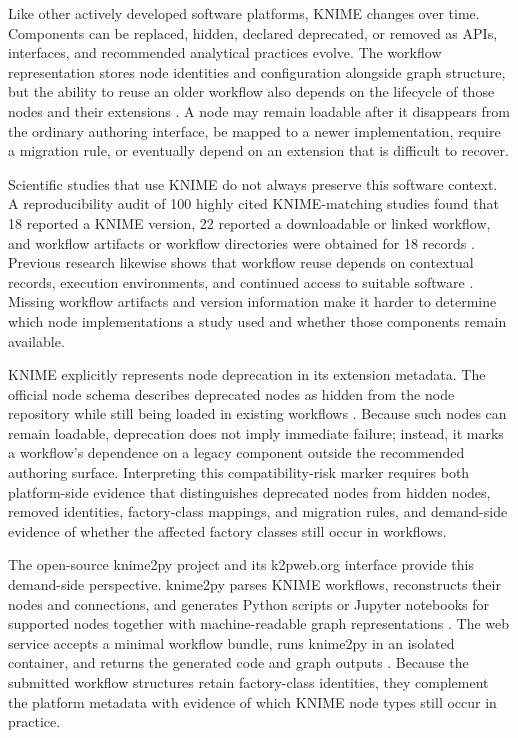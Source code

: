 \documentclass[runningheads]{llncs}
\begin{document}
Like other actively developed software platforms, KNIME changes over time.
Components can be replaced, hidden, declared deprecated, or removed as APIs,
interfaces, and recommended analytical practices evolve. The workflow
representation stores node identities and configuration alongside graph
structure, but the ability to reuse an older workflow also depends on the
lifecycle of those nodes and their extensions
\cite{DeRoure2011Preservation,Belhajjame2011Substitute}. A node may remain
loadable after it disappears from the ordinary authoring interface, be mapped
to a newer implementation, require a migration rule, or eventually depend on
an extension that is difficult to recover.

Scientific studies that use KNIME do not always preserve this software context.
A reproducibility audit of 100 highly cited KNIME-matching studies found that
18 reported a KNIME version, 22 reported a downloadable or linked workflow, and
workflow artifacts or workflow directories were obtained for 18 records
\cite{KaplanKNIMEWorkflowAudit2026}. Previous research likewise shows that
workflow reuse depends on contextual records, execution environments, and
continued access to suitable software
\cite{Willoughby2017Documentation,Ghoshal2021ScienceCapsule}. Missing workflow
artifacts and version information make it harder to determine which node
implementations a study used and whether those components remain available.

KNIME explicitly represents node deprecation in its extension metadata. The
official node schema describes deprecated nodes as hidden from the node
repository while still being loaded in existing workflows
\cite{KNIMEWorkbenchNodeSchema2026}. Because such nodes can remain loadable,
deprecation does not imply immediate failure; instead, it marks a workflow's
dependence on a legacy component outside the recommended authoring surface.
Interpreting this compatibility-risk marker requires both platform-side
evidence that distinguishes deprecated nodes from hidden nodes, removed
identities, factory-class mappings, and migration rules, and demand-side
evidence of whether the affected factory classes still occur in workflows.

The open-source knime2py project and its k2pweb.org interface provide this
demand-side perspective. knime2py parses KNIME workflows, reconstructs their
nodes and connections, and generates Python scripts or Jupyter notebooks for
supported nodes together with machine-readable graph representations
\cite{KaplanKnime2py2026}. The web service accepts a minimal workflow bundle,
runs knime2py in an isolated container, and returns the generated code and
graph outputs \cite{K2PWeb2026}. Because the submitted workflow structures retain
factory-class identities, they complement the platform metadata with evidence
of which KNIME node types still occur in practice.
\end{document}
